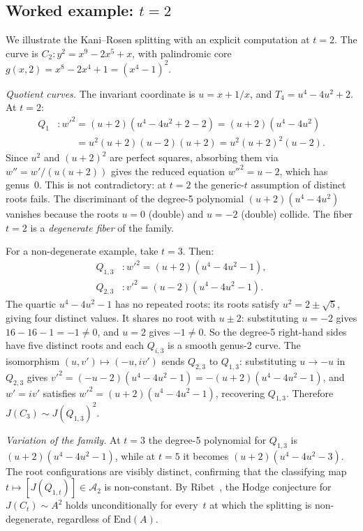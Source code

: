 \documentclass[11pt]{article}
\theoremstyle{plain}
\theoremstyle{definition}
\theoremstyle{remark}
\newcommand{\End}{\mathrm{End}}
\begin{document}
\subsection{Worked example: $t = 2$}

We illustrate the Kani--Rosen splitting with an explicit computation
at $t = 2$.  The curve is $C_2\colon y^2 = x^9 - 2x^5 + x$, with
palindromic core $g(x,2) = x^8 - 2x^4 + 1 = (x^4 - 1)^2$.

\emph{Quotient curves.}
The invariant coordinate is $u = x + 1/x$, and $T_4 = u^4 - 4u^2 + 2$.
At $t = 2$:
\begin{align*}
  Q_1 &\colon w'^2 = (u+2)(u^4 - 4u^2 + 2 - 2) = (u+2)(u^4 - 4u^2) \\
      &\phantom{\colon w'^2} = u^2(u+2)(u-2)(u+2) = u^2(u+2)^2(u-2).
\end{align*}
Since $u^2$ and $(u+2)^2$ are perfect squares, absorbing them via
$w'' = w'/(u(u+2))$ gives the reduced equation
$w''^2 = u - 2$, which has genus~0.  This is not contradictory: at
$t = 2$ the generic-$t$ assumption of distinct roots fails.  The
discriminant of the degree-5 polynomial $(u+2)(u^4 - 4u^2)$ vanishes
because the roots $u = 0$ (double) and $u = -2$ (double) collide.
The fiber $t = 2$ is a \emph{degenerate fiber} of the family.

For a non-degenerate example, take $t = 3$.  Then:
\begin{align*}
  Q_{1,3} &\colon w'^2 = (u+2)(u^4 - 4u^2 - 1), \\
  Q_{2,3} &\colon v'^2 = (u-2)(u^4 - 4u^2 - 1).
\end{align*}
The quartic $u^4 - 4u^2 - 1$ has no repeated roots: its roots
satisfy $u^2 = 2 \pm \sqrt{5}$, giving four distinct values.
It shares no root with $u \pm 2$: substituting $u = -2$ gives
$16 - 16 - 1 = -1 \neq 0$, and $u = 2$ gives $-1 \neq 0$.
So the degree-5 right-hand sides have five distinct roots and each
$Q_{i,3}$ is a smooth genus-2 curve.  The isomorphism
$(u, v') \mapsto (-u, iv')$ sends $Q_{2,3}$ to $Q_{1,3}$:
substituting $u \to -u$ in $Q_{2,3}$ gives
$v'^2 = (-u-2)(u^4 - 4u^2 - 1) = -(u+2)(u^4 - 4u^2 - 1)$,
and $w' = iv'$ satisfies $w'^2 = (u+2)(u^4-4u^2-1)$, recovering
$Q_{1,3}$.  Therefore $J(C_3) \sim J(Q_{1,3})^2$.

\emph{Variation of the family.}
At $t = 3$ the degree-5 polynomial for $Q_{1,3}$ is
$(u+2)(u^4 - 4u^2 - 1)$, while at $t = 5$ it becomes
$(u+2)(u^4 - 4u^2 - 3)$.  The root configurations are
visibly distinct, confirming that the classifying map
$t \mapsto [J(Q_{1,t})] \in \mathcal{A}_2$ is non-constant.
By Ribet~\cite{Ribet83}, the Hodge conjecture for $J(C_t) \sim A^2$
holds unconditionally for every~$t$ at which the splitting is
non-degenerate, regardless of $\End(A)$.
\end{document}
